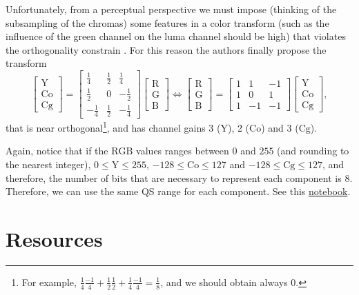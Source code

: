 Unfortunately, from a perceptual perspective we must impose (thinking
of the subsampling of the chromas) some features in a color transform
(such as the influence of the green channel on the luma channel should
be high) that violates the orthogonality constrain
\cite{malvar2008lifting}. For this reason the authors finally propose
the transform
\begin{equation}
  \begin{bmatrix}
    \text{Y} \\
    \text{Co} \\
    \text{Cg}
  \end{bmatrix}
  =
  \begin{bmatrix}
    \frac{1}{4} &  \frac{1}{2}  &  \frac{1}{4} \\ 
    \frac{1}{2} &            0  & -\frac{1}{2} \\
    -\frac{1}{4} &  \frac{1}{2}  & -\frac{1}{4}
  \end{bmatrix}
  \begin{bmatrix}
    \text{R} \\
    \text{G} \\
    \text{B}
  \end{bmatrix}
  \Leftrightarrow
  \begin{bmatrix}
    \text{R} \\
    \text{G} \\
    \text{B}
  \end{bmatrix}
  =
  \begin{bmatrix}
    1  &  1  & -1 \\ 
    1  &  0  &  1 \\ 
    1  & -1  & -1
  \end{bmatrix}
  \begin{bmatrix}
    \text{Y} \\
    \text{Co} \\
    \text{Cg}
  \end{bmatrix},
\end{equation}
that is near orthogonal\footnote{For example, $\frac{1}{4}\frac{-1}{4}
+ \frac{1}{2}\frac{1}{2} + \frac{1}{4}\frac{-1}{4} = \frac{1}{8}$, and
we should obtain always 0.}, and has channel gains 3 ($\text{Y}$), 2
($\text{Co}$) and 3 ($\text{Cg}$). %

Again, notice that if the $\text{RGB}$ values ranges between $0$
and $255$ (and rounding to the nearest integer), $0\le\text{Y}\le 255$,
$-128\le\text{Co}\le 127$ and $-128\le\text{Cg}\le 127$, and
therefore, the number of bits that are necessary to represent each
component is $8$. Therefore, we can use the same QS range for each
component. See this \href{https://github.com/Sistemas-Multimedia/Sistemas-Multimedia.github.io/blob/master/milestones/06-YUV_compression/YCrCb_matrix.ipynb}{notebook}.


\section{Resources}
\renewcommand{\addcontentsline}[3]{}%

